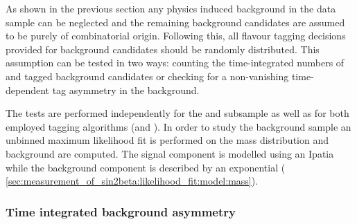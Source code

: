 As shown in the previous section any physics induced background in the data
sample can be neglected and the remaining background candidates are assumed to
be purely of combinatorial origin. Following this, all flavour tagging decisions
provided for background candidates should be randomly distributed. This
assumption can be tested in two ways: counting the time-integrated numbers of
\Bd and \Bdbar tagged background candidates or checking for a non-vanishing
time-dependent tag asymmetry in the background.

The tests are performed independently for the \catDD and \catLL subsample as
well as for both employed tagging algorithms (\OS and \SSpi). In order to study
the background sample an unbinned maximum likelihood fit is performed on the \Bd
mass distribution and background \sWeights \cite{Pivk:2004ty} are computed. The
signal component is modelled using an Ipatia \PDF while the background component
is described by an exponential \PDF (\cf
\cref{sec:measurement_of_sin2beta:likelihood_fit:model:mass}).

\subsubsection{Time integrated background asymmetry}
\label{sec:measurement_of_sin2beta:physic_backgrounds:tagging_asymmetries:time_integrated}

